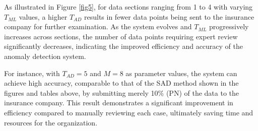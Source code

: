 \documentclass[12pt]{article}
\begin{document}
As illustrated in Figure \ref{fig5}, for data sections ranging
from 1 to 4 with varying $T_{ML}$ values, a higher $T_{AD}$
results in fewer data points being sent to the insurance company
for further examination. As the system evolves and $T_{ML}$
progressively increases across sections, the number of data points
requiring expert review significantly decreases, indicating the
improved efficiency and accuracy of the anomaly detection system.

For instance, with $T_{AD} = 5$ and $M = 8$ as parameter values,
the system can achieve high accuracy, comparable to that of the
SAD method shown in the figures and tables above, by submitting
merely 10\% (PN) of the data to the insurance company. This result
demonstrates a significant improvement in efficiency compared to
manually reviewing each case, ultimately saving time and resources
for the organization.
\end{document}
